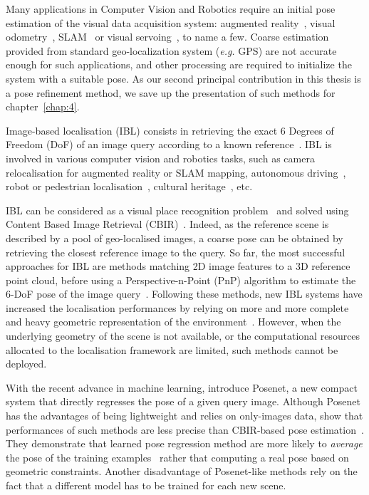Many applications in Computer Vision and Robotics require an initial pose estimation of the visual data acquisition system: augmented reality~\citep{Arth2015}, visual odometry~\citep{Pascoe2015a}, SLAM~\citep{Milford2012} or visual servoing~\citep{Marchand2016}, to name a few. Coarse estimation provided from standard geo-localization system (\textit{e.g.} GPS) are not accurate enough for such applications, and other processing are required to initialize the system with a suitable pose. As our second principal contribution in this thesis is a pose refinement method, we save up the presentation of such methods for chapter~\ref{chap:4}.

Image-based localisation (IBL) consists in retrieving the exact 6 Degrees of Freedom (DoF) of an image query according to a known reference~\citep{Piasco2017}. IBL is involved in various computer vision and robotics tasks, such as camera relocalisation for augmented reality or SLAM mapping\citep{Meng2016}, autonomous driving~\citep{Brahmbhatt2017a}, robot or pedestrian localisation~\citep{Sattler2015}, cultural heritage~\citep{Aubry2014}, etc. 

IBL can be considered as a visual place recognition problem~\citep{Lowry2016} and solved using Content Based Image Retrieval (CBIR)~\citep{Arandjelovic2017}. Indeed, as the reference scene is described by a pool of geo-localised images, a coarse pose can be obtained by retrieving the closest reference image to the query. So far, the most successful approaches for IBL are methods matching 2D image features to a 3D reference point cloud, before using a Perspective-n-Point (PnP) algorithm to estimate the 6-DoF pose of the image query~\citep{Sattler2016a, Sattler2018}. Following these methods, new IBL systems have increased the localisation performances by relying on more and more complete and heavy geometric representation of the environment~\citep{Taira2018, Schonberger2017a}. However, when the underlying geometry of the scene is not available, or the computational resources allocated to the localisation framework are limited, such methods cannot be deployed.

With the recent advance in machine learning, \citet{Kendall2015} introduce Posenet, a new compact system that directly regresses the pose of a given query image. Although Posenet has the advantages of being lightweight and relies on only-images data, \citet{Sattler2019} show that performances of such methods are less precise than CBIR-based pose estimation~\citep{Torii2015}. They demonstrate that learned pose regression method are more likely to \textit{average} the pose of the training examples~\citep{Torii2011} rather that computing a real pose based on geometric constraints. Another disadvantage of Posenet-like methods rely on the fact that a different model has to be trained for each new scene. 

